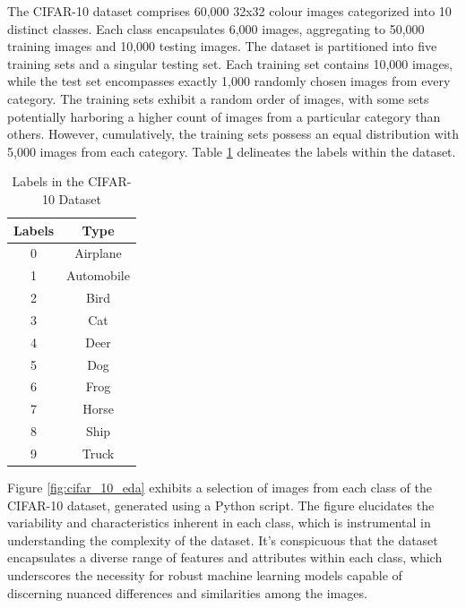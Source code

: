 The CIFAR-10 dataset comprises 60,000 32x32 colour images categorized into 10 distinct classes. Each class encapsulates 6,000 images, aggregating to 50,000 training images and 10,000 testing images. The dataset is partitioned into five training sets and a singular testing set. Each training set contains 10,000 images, while the test set encompasses exactly 1,000 randomly chosen images from every category. The training sets exhibit a random order of images, with some sets potentially harboring a higher count of images from a particular category than others. However, cumulatively, the training sets possess an equal distribution with 5,000 images from each category. Table \ref{tab:Cifar-10 labels} delineates the labels within the dataset.\\

\begin{table}[h]
    \centering
    \begin{tabular}{ |c|c| }
        \hline
        Labels & Type \\
        \hline
         0 & Airplane \\
         1 & Automobile \\
         2 & Bird\\
         3 & Cat \\
         4 & Deer \\
         5 & Dog \\
         6 & Frog \\
         7 & Horse \\
         8 & Ship \\
         9 & Truck \\
        \hline
    \end{tabular}
    \caption{Labels in the CIFAR-10 Dataset}
    \label{tab:Cifar-10 labels}
\end{table}

Figure \ref{fig:cifar_10_eda} exhibits a selection of images from each class of the CIFAR-10 dataset, generated using a Python script. The figure elucidates the variability and characteristics inherent in each class, which is instrumental in understanding the complexity of the dataset. It's conspicuous that the dataset encapsulates a diverse range of features and attributes within each class, which underscores the necessity for robust machine learning models capable of discerning nuanced differences and similarities among the images.

